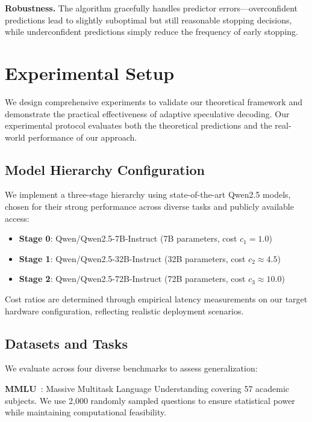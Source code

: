 \documentclass{article}
\theoremstyle{plain}
\theoremstyle{definition}
\theoremstyle{remark}
\begin{document}
\textbf{Robustness.} The algorithm gracefully handles predictor errors—overconfident predictions lead to slightly suboptimal but still reasonable stopping decisions, while underconfident predictions simply reduce the frequency of early stopping.

\section{Experimental Setup}
\label{sec:experimental_setup}

We design comprehensive experiments to validate our theoretical framework and demonstrate the practical effectiveness of adaptive speculative decoding. Our experimental protocol evaluates both the theoretical predictions and the real-world performance of our approach.

\subsection{Model Hierarchy Configuration}

We implement a three-stage hierarchy using state-of-the-art Qwen2.5 models, chosen for their strong performance across diverse tasks and publicly available access:

\begin{itemize}
\item \textbf{Stage 0}: Qwen/Qwen2.5-7B-Instruct (7B parameters, cost $c_1 = 1.0$)
\item \textbf{Stage 1}: Qwen/Qwen2.5-32B-Instruct (32B parameters, cost $c_2 \approx 4.5$)
\item \textbf{Stage 2}: Qwen/Qwen2.5-72B-Instruct (72B parameters, cost $c_3 \approx 10.0$)
\end{itemize}

Cost ratios are determined through empirical latency measurements on our target hardware configuration, reflecting realistic deployment scenarios.

\subsection{Datasets and Tasks}

We evaluate across four diverse benchmarks to assess generalization:

\textbf{MMLU}~\citep{hendrycks2020measuring}: Massive Multitask Language Understanding covering 57 academic subjects. We use 2,000 randomly sampled questions to ensure statistical power while maintaining computational feasibility.
\end{document}
